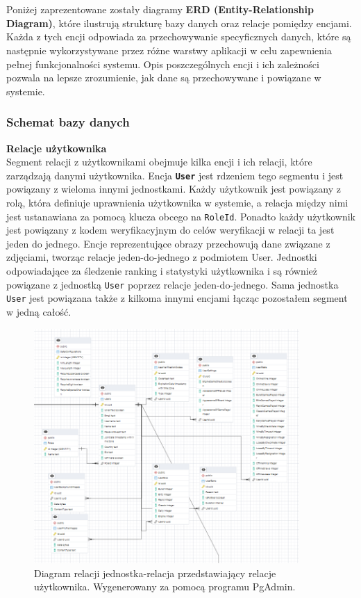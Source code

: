 \documentclass[12pt,a4paper]{article}
\begin{document}
\\\\
Poniżej zaprezentowane zostały diagramy \textbf{ERD (Entity-Relationship Diagram)}, które ilustrują strukturę bazy danych oraz relacje pomiędzy encjami. Każda z tych encji odpowiada za przechowywanie specyficznych danych, które są następnie wykorzystywane przez różne warstwy aplikacji w celu zapewnienia pełnej funkcjonalności systemu. Opis poszczególnych encji i ich zależności pozwala na lepsze zrozumienie, jak dane są przechowywane i powiązane w systemie.

\newpage

\subsubsection{Schemat bazy danych}

\noindent \textbf{Relacje użytkownika}\\
Segment relacji z użytkownikami obejmuje kilka encji i ich relacji, które zarządzają danymi użytkownika. Encja \textbf{\texttt{User}} jest rdzeniem tego segmentu i jest powiązany z wieloma innymi jednostkami. Każdy użytkownik jest powiązany z rolą, która definiuje uprawnienia użytkownika w systemie, a relacja między nimi jest ustanawiana za pomocą klucza obcego na \texttt{RoleId}. Ponadto każdy użytkownik jest powiązany z kodem weryfikacyjnym do celów weryfikacji w relacji ta jest jeden do jednego. Encje reprezentujące obrazy przechowują dane związane z zdjęciami, tworząc relacje jeden-do-jednego z podmiotem User. Jednostki odpowiadające za śledzenie ranking i statystyki użytkownika i są również powiązane z jednostką \texttt{User} poprzez relacje jeden-do-jednego. Sama jednostka \texttt{User} jest powiązana także z kilkoma innymi encjami łącząc pozostałem segment w jedną całość.

\vspace{1cm}
\begin{figure}[h!]
    \centering
    \includegraphics[width=0.9\textwidth]{images/ERD_user.png}
    \caption{Diagram relacji jednostka-relacja przedstawiający relacje użytkownika. Wygenerowany za pomocą programu PgAdmin.}
\end{figure}
\end{document}
